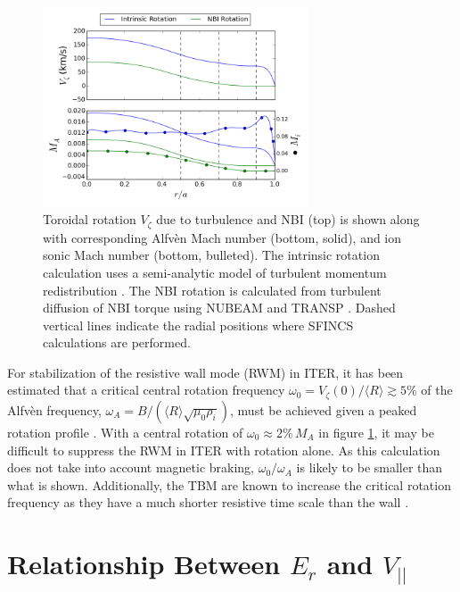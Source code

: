 \documentclass{article}
\numberwithin{figure}{section}
\numberwithin{equation}{section}
\begin{document}
\begin{figure}[h!]
\centering
\includegraphics[width=0.7\textwidth]{rotationestimate.png}
\caption{\label{fig:rotation_estimate} Toroidal rotation $V_{\zeta}$ due to turbulence and NBI (top) is shown along with  corresponding Alfv\`{e}n Mach number (bottom, solid), and ion sonic Mach number (bottom, bulleted). The intrinsic rotation calculation uses a semi-analytic model of turbulent momentum redistribution \cite{Hillesheim2015}. The NBI rotation is calculated from turbulent diffusion of NBI torque using NUBEAM and TRANSP \cite{Poli2014}. Dashed vertical lines indicate the radial positions where SFINCS calculations are performed. }
\end{figure}

For stabilization of the resistive wall mode (RWM) in ITER, it has been estimated that a critical central rotation frequency $\omega_0 = V_{\zeta}(0)/\langle R \rangle \gtrsim 5\%$ of the Alfv\`{e}n frequency, $\omega_A = B/(\langle R\rangle\sqrt{\mu_0 \rho_i})$, must be achieved given a peaked rotation profile  \cite{Liu2004}. With a central rotation of $\omega_0 \approx 2\% \, M_A$ in figure \ref{fig:rotation_estimate}, it may be difficult to suppress the RWM in ITER with rotation alone. As this calculation does not take into account magnetic braking, $\omega_0/\omega_A$ is likely to be smaller than what is shown. Additionally, the TBM are known to increase the critical rotation frequency as they have a much shorter resistive time scale than the wall \cite{Liu2004}.

\FloatBarrier

\section{Relationship Between $E_r$ and $V_{||}$}\label{Erandv}
\end{document}
